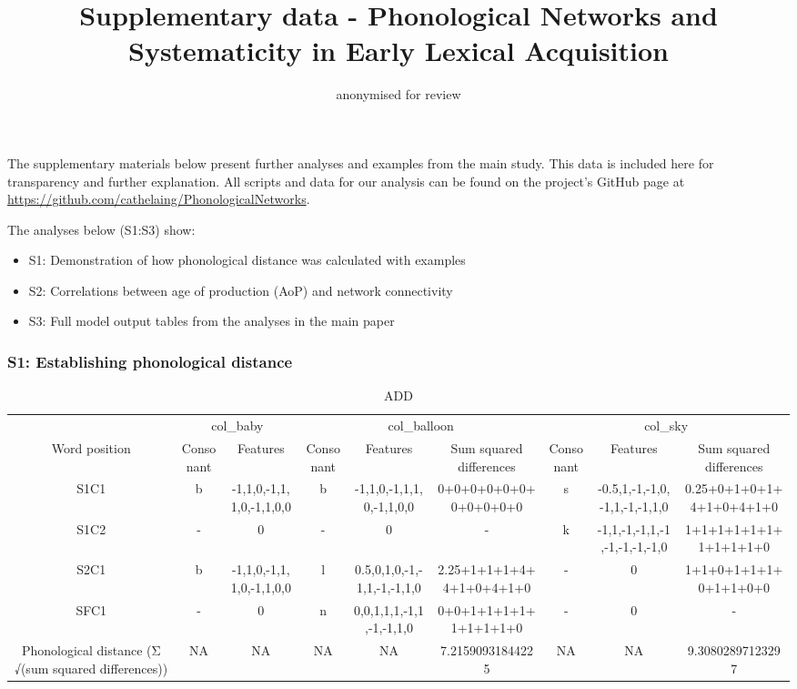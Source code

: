 \documentclass[
]{article}
\title{Supplementary data - Phonological Networks and Systematicity in
Early Lexical Acquisition}
\author{anonymised for review}
\date{}
\providecommand{\tightlist}{%
  \setlength{\itemsep}{0pt}\setlength{\parskip}{0pt}}
\begin{document}
\maketitle

The supplementary materials below present further analyses and examples
from the main study. This data is included here for transparency and
further explanation. All scripts and data for our analysis can be found
on the project's GitHub page at
\url{https://github.com/cathelaing/PhonologicalNetworks}.

The analyses below (S1:S3) show:

\begin{itemize}
\tightlist
\item
  S1: Demonstration of how phonological distance was calculated with
  examples
\item
  S2: Correlations between age of production (AoP) and network
  connectivity
\item
  S3: Full model output tables from the analyses in the main paper
\end{itemize}

\hypertarget{s1-establishing-phonological-distance}{%
\subsubsection{S1: Establishing phonological
distance}\label{s1-establishing-phonological-distance}}

\begin{longtable}[t]{ccccccccc}
\caption{\label{tab:table-model-outputs}ADD}\\
\toprule
\multicolumn{1}{c}{ } & \multicolumn{2}{c}{col\_baby} & \multicolumn{3}{c}{col\_balloon} & \multicolumn{3}{c}{col\_sky} \\
\cmidrule(l{3pt}r{3pt}){2-3} \cmidrule(l{3pt}r{3pt}){4-6} \cmidrule(l{3pt}r{3pt}){7-9}
Word position & Consonant & Features & Consonant & Features & Sum squared differences & Consonant & Features & Sum squared differences\\
\midrule
S1C1 & b & -1,1,0,-1,1,1,0,-1,1,0,0 & b & -1,1,0,-1,1,1,0,-1,1,0,0 & 0+0+0+0+0+0+0+0+0+0+0 & s & -0.5,1,-1,-1,0,-1,1,-1,-1,1,0 & 0.25+0+1+0+1+4+1+0+4+1+0\\
S1C2 & - & 0 & - & 0 & - & k & -1,1,-1,-1,1,-1,-1,-1,-1,-1,0 & 1+1+1+1+1+1+1+1+1+1+0\\
S2C1 & b & -1,1,0,-1,1,1,0,-1,1,0,0 & l & 0.5,0,1,0,-1,-1,1,-1,-1,1,0 & 2.25+1+1+1+4+4+1+0+4+1+0 & - & 0 & 1+1+0+1+1+1+0+1+1+0+0\\
SFC1 & - & 0 & n & 0,0,1,1,1,-1,1,-1,-1,1,0 & 0+0+1+1+1+1+1+1+1+1+0 & - & 0 & -\\
Phonological distance (Σ √(sum squared differences)) & NA & NA & NA & NA & 7.21590931844225 & NA & NA & 9.30802897123297\\
\bottomrule
\end{longtable}
\end{document}
